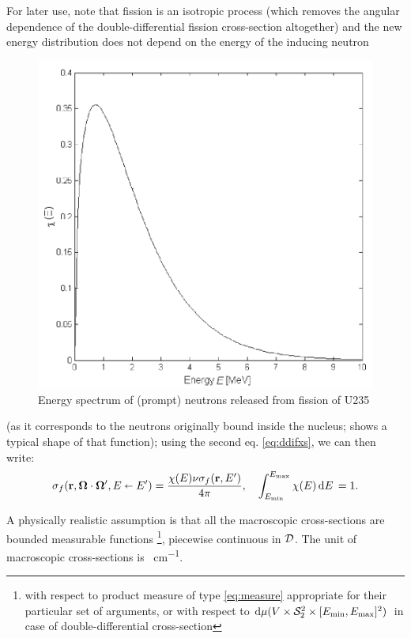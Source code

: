 For later use, note that fission is an isotropic process (which removes the angular dependence of the
double-differential fission cross-section altogether) and the new energy distribution does not depend on the energy of 
the inducing neutron 
\begin{figure}[hbt]
\begin{center}
  \includegraphics[scale=.6]{spectrum}
  \caption{Energy spectrum of (prompt) neutrons released from fission of U235}
  \label{fig:spectrum}
\end{center}
\end{figure}
(as it corresponds to the neutrons originally bound inside the nucleus; 
shows a typical shape of that function); using the second eq.
\eqref{eq:ddifxs}, we can then write:
\begin{equation}\label{eq:sf}
\sigma_f(\mathbf{r},\mathbf{\Omega}\cdot\mathbf{\Omega}',E\shortleftarrow E') = \frac{\chi(E)\nu\sigma_f(\mathbf{r},E')}{4\pi},\quad 
\int_{E_{\text{min}}}^{E_{\text{max}}}\chi(E)\,\text{d}E\, = 1.
\end{equation}
 
A physically realistic assumption is that all the macroscopic cross-sections are bounded measurable functions
\footnote{with respect to product measure of type \eqref{eq:measure} appropriate for their particular set of arguments,
 or with respect to $\text{d}\mu(V\times\mathcal{S}_2^2\times [E_{\text{min}},E_{\text{max}}]^2)\,$ in case of double-differential cross-section},
 piecewise continuous in $\mathcal{D}$. The unit of macroscopic cross-sections is \SI{}{cm^{-1}}.

